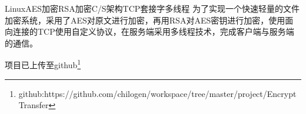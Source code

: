 
\begin{Cabstract}{Linux}{AES加密}{RSA加密}{C/S架构}{TCP套接字}{多线程}
为了实现一个快速轻量的文件加密系统，采用了AES对原文进行加密，再用RSA对AES密钥进行加密，使用面向连接的TCP使用自定义协议，在服务端采用多线程技术，完成客户端与服务端的通信。

项目已上传至github\footnote{github:https://github.com/chilogen/workspace/tree/master/project/EncryptTransfer}
\end{Cabstract}

